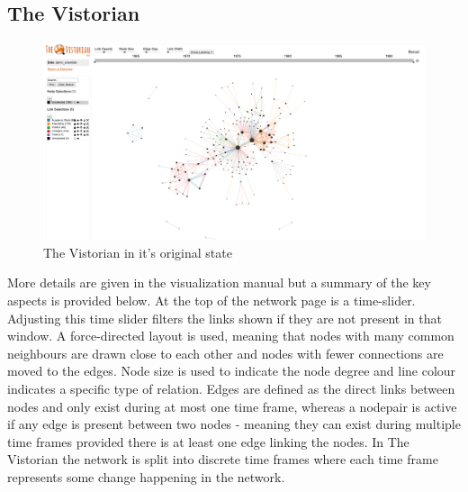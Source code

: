 \subsection{The Vistorian}

\begin{figure}[h!]
  \begin{center}
  \includegraphics[trim={0 0 0 0}, width=140mm]{./Figures/vistorianOriginal.png}
  \caption{The Vistorian in it's original state}
  \label{fig:vistorianOriginal}
  \end{center}
\end{figure}

More details are given in the visualization manual \cite{vismanual} but a summary of the key aspects is provided below.
At the top of the network page is a time-slider. Adjusting this time slider filters the links shown if they are not present in that window. A force-directed layout is used, meaning that nodes with many common neighbours are drawn close to each other and nodes with fewer connections are moved to the edges. Node size is used to indicate the node degree and line colour indicates a specific type of relation. Edges are defined as the direct links between nodes and only exist during at most one time frame, whereas a nodepair is active if any edge is present between two nodes - meaning they can exist during multiple time frames provided there is at least one edge linking the nodes. In The Vistorian the network is split into discrete time frames where each time frame represents some change happening in the network. 





